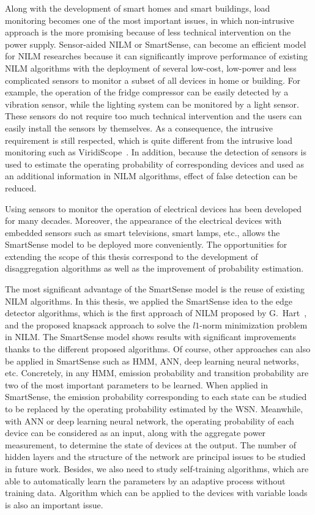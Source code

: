 Along with the development of smart homes and smart buildings, load monitoring becomes one of the most important issues, in which non-intrusive approach is the more promising because of less technical intervention on the power supply. Sensor-aided NILM or SmartSense, can become an efficient model for NILM researches because it can significantly improve performance of existing NILM algorithms with the deployment of several low-cost, low-power and less complicated sensors to monitor a subset of all devices in home or building. For example, the operation of the fridge compressor can be easily detected by a vibration sensor, while the lighting system can be monitored by a light sensor. These sensors do not require too much technical intervention and the users can easily install the sensors by themselves. As a consequence, the intrusive requirement is still respected, which is quite different from the intrusive load monitoring such as ViridiScope~\cite{Kim09Ubicomp}. In addition, because the detection of sensors is used to estimate the operating probability of corresponding devices and used as an additional information in NILM algorithms, effect of false detection can be reduced. 
\par Using sensors to monitor the operation of electrical devices has been developed for many decades. Moreover, the appearance of the electrical devices with embedded sensors such as smart televisions, smart lamps, etc., allows the SmartSense model to be deployed more conveniently. The opportunities for extending the scope of this thesis correspond to the development of disaggregation algorithms as well as the improvement of probability estimation.
\par The most significant advantage of the SmartSense model is the reuse of existing NILM algorithms. In this thesis, we applied the SmartSense idea to the edge detector algorithms, which is the first approach of NILM proposed by G.~Hart~\cite{Hart92}, and the proposed knapsack approach to solve the $l1$-norm minimization problem in NILM. The SmartSense model shows results with significant improvements thanks to the different proposed algorithms. Of course, other approaches can also be applied in SmartSense such as HMM, ANN, deep learning neural networks, etc. Concretely, in any HMM, emission probability and transition probability are two of the most important parameters to be learned. When applied in SmartSense, the emission probability corresponding to each state can be studied to be replaced by the operating probability estimated by the WSN. Meanwhile, with ANN or deep learning neural network, the operating probability of each device can be considered as an input, along with the aggregate power measurement, to determine the state of devices at the output. The number of hidden layers and the structure of the network are principal issues to be studied in future work. Besides, we also need to study self-training algorithms, which are able to automatically learn the parameters by an adaptive process without training data. Algorithm which can be applied to the devices with variable loads is also an important issue.
